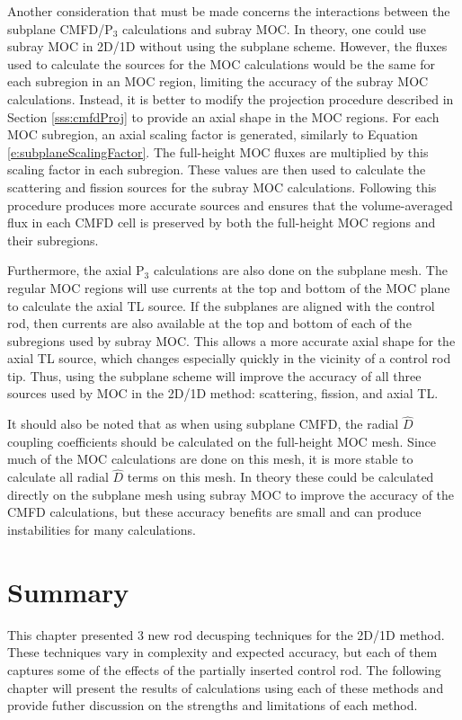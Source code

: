 Another consideration that must be made concerns the interactions between the subplane CMFD/P$_3$ calculations and subray MOC.  In theory, one could use subray MOC in 2D/1D without using the subplane scheme.  However, the fluxes used to calculate the sources for the MOC calculations would be the same for each subregion in an MOC region, limiting the accuracy of the subray MOC calculations.  Instead, it is better to modify the projection procedure described in Section \ref{sss:cmfdProj} to provide an axial shape in the MOC regions.  For each MOC subregion, an axial scaling factor is generated, similarly to Equation \ref{e:subplaneScalingFactor}.  The full-height MOC fluxes are multiplied by this scaling factor in each subregion.  These values are then used to calculate the scattering and fission sources for the subray MOC calculations.  Following this procedure produces more accurate sources and ensures that the volume-averaged flux in each CMFD cell is preserved by both the full-height MOC regions and their subregions.

Furthermore, the axial P$_3$ calculations are also done on the subplane mesh.  The regular MOC regions will use currents at the top and bottom of the MOC plane to calculate the axial TL source.  If the subplanes are aligned with the control rod, then currents are also available at the top and bottom of each of the subregions used by subray MOC.  This allows a more accurate axial shape for the axial TL source, which changes especially quickly in the vicinity of a control rod tip.  Thus, using the subplane scheme will improve the accuracy of all three sources used by MOC in the 2D/1D method: scattering, fission, and axial TL.

It should also be noted that as when using subplane CMFD, the radial $\hat{D}$ coupling coefficients should be calculated on the full-height MOC mesh.  Since much of the MOC calculations are done on this mesh, it is more stable to calculate all radial $\hat{D}$ terms on this mesh.  In theory these could be calculated directly on the subplane mesh using subray MOC to improve the accuracy of the CMFD calculations, but these accuracy benefits are small and can produce instabilities for many calculations.

\section{Summary}

This chapter presented 3 new rod decusping techniques for the 2D/1D method.  These techniques vary in complexity and expected accuracy, but each of them captures some of the effects of the partially inserted control rod.  The following chapter will present the results of calculations using each of these methods and provide futher discussion on the strengths and limitations of each method.